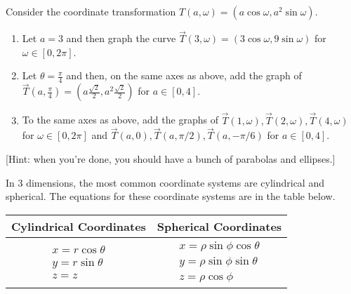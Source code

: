\begin{problem}
Consider the coordinate transformation $T(a,\omega)=(a\cos\omega,a^2\sin \omega)$.
\begin{enumerate}
\item{}%
 Let $a=3$ and then graph the curve $\vec T(3,\omega)=(3\cos\omega,9\sin\omega)$ for $\omega\in[0,2\pi]$.
\item{}%
 Let $\theta=\frac{\pi}{4}$ and then, on the same axes as above, add the graph of 
$\vec T\left(a,\frac{\pi}{4}\right)=\left(a\frac{\sqrt 2}{2},a^2 \frac{\sqrt 2}{2}\right)$ for $a\in[0,4]$.
\item{}To the same axes as above, add the graphs of 
$\vec T(1,\omega), \vec T(2,\omega), \vec T(4,\omega)$  for $\omega\in[0,2\pi]$ and 
$\vec T(a,0), \vec T(a,\pi/2), \vec T(a,-\pi/6)$ for $a\in[0,4]$. 
\end{enumerate}
[Hint: when you're done, you should have a bunch of parabolas and ellipses.]
\end{problem}

In 3 dimensions, the most common coordinate systems are cylindrical and spherical.  The equations for these coordinate systems are in the table below. 
\begin{center}
\begin{tabular}{cc}
Cylindrical Coordinates & Spherical Coordinates\\
\hline
$\begin{array}{l}
x=r\cos\theta\\
y=r\sin\theta\\
z=z
\end{array}$
&
$\begin{array}{l}
x=\rho\sin\phi\cos\theta\\
y=\rho\sin\phi\sin\theta\\
z=\rho\cos\phi
\end{array}$
\end{tabular}
\end{center}

